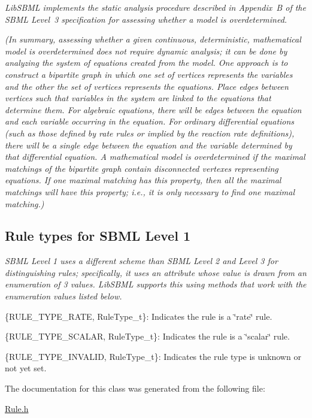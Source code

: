{\itshape  Lib\+S\+B\+ML implements the static analysis procedure described in Appendix~B of the S\+B\+ML Level~3 specification for assessing whether a model is overdetermined.}

{\itshape  (In summary, assessing whether a given continuous, deterministic, mathematical model is overdetermined does not require dynamic analysis; it can be done by analyzing the system of equations created from the model. One approach is to construct a bipartite graph in which one set of vertices represents the variables and the other the set of vertices represents the equations. Place edges between vertices such that variables in the system are linked to the equations that determine them. For algebraic equations, there will be edges between the equation and each variable occurring in the equation. For ordinary differential equations (such as those defined by rate rules or implied by the reaction rate definitions), there will be a single edge between the equation and the variable determined by that differential equation. A mathematical model is overdetermined if the maximal matchings of the bipartite graph contain disconnected vertexes representing equations. If one maximal matching has this property, then all the maximal matchings will have this property; i.\+e., it is only necessary to find one maximal matching.)}

{\itshape }\hypertarget{classdoc__rules__general__summary_RuleType_t}{}\subsection{Rule types for S\+B\+M\+L Level 1}\label{classdoc__rules__general__summary_RuleType_t}
{\itshape  S\+B\+ML Level 1 uses a different scheme than S\+B\+ML Level 2 and Level 3 for distinguishing rules; specifically, it uses an attribute whose value is drawn from an enumeration of 3 values. Lib\+S\+B\+ML supports this using methods that work with the enumeration values listed below.}

{\itshape  \begin{DoxyItemize}
\item \{R\+U\+L\+E\+\_\+\+T\+Y\+P\+E\+\_\+\+R\+A\+TE, Rule\+Type\+\_\+t\}\+: Indicates the rule is a \char`\"{}rate\char`\"{} rule. \item \{R\+U\+L\+E\+\_\+\+T\+Y\+P\+E\+\_\+\+S\+C\+A\+L\+AR, Rule\+Type\+\_\+t\}\+: Indicates the rule is a \char`\"{}scalar\char`\"{} rule. \item \{R\+U\+L\+E\+\_\+\+T\+Y\+P\+E\+\_\+\+I\+N\+V\+A\+L\+ID, Rule\+Type\+\_\+t\}\+: Indicates the rule type is unknown or not yet set. \end{DoxyItemize}
}

The documentation for this class was generated from the following file\+:\begin{DoxyCompactItemize}
\item 
\hyperlink{_rule_8h}{Rule.\+h}\end{DoxyCompactItemize}
